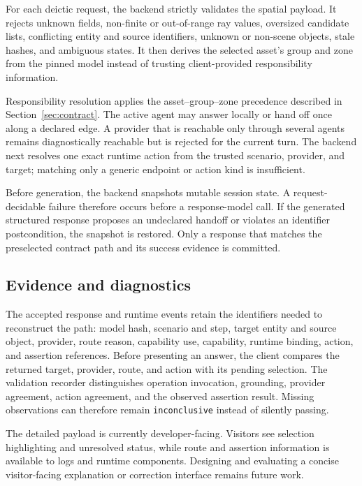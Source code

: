 For each deictic request, the backend strictly validates the spatial payload.
It rejects unknown fields, non-finite or out-of-range ray values, oversized
candidate lists, conflicting entity and source identifiers, unknown or
non-scene objects, stale hashes, and ambiguous states.  It then derives the
selected asset's group and zone from the pinned model instead of trusting
client-provided responsibility information.

Responsibility resolution applies the asset--group--zone precedence described
in Section~\ref{sec:contract}.  The active agent may answer locally or hand off
once along a declared edge.  A provider that is reachable only through several
agents remains diagnostically reachable but is rejected for the current turn.
The backend next resolves one exact runtime action from the trusted scenario,
provider, and target; matching only a generic endpoint or action kind is
insufficient.

Before generation, the backend snapshots mutable session state.  A
request-decidable failure therefore occurs before a response-model call.  If the
generated structured response proposes an undeclared handoff or violates an
identifier postcondition, the snapshot is restored.  Only a response that
matches the preselected contract path and its success evidence is committed.

\subsection{Evidence and diagnostics}

The accepted response and runtime events retain the identifiers needed to
reconstruct the path: model hash, scenario and step, target entity and source
object, provider, route reason, capability use, capability, runtime binding,
action, and assertion references.  Before presenting an answer, the client
compares the returned target, provider, route, and action with its pending
selection.  The validation recorder distinguishes operation invocation,
grounding, provider agreement, action agreement, and the observed assertion
result.  Missing observations can therefore remain \texttt{inconclusive}
instead of silently passing.

The detailed payload is currently developer-facing.  Visitors see selection
highlighting and unresolved status, while route and assertion information is
available to logs and runtime components.  Designing and evaluating a concise
visitor-facing explanation or correction interface remains future work.

